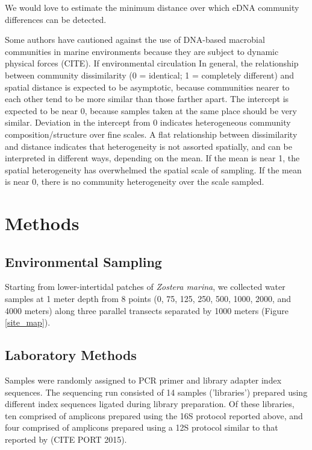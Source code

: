 \documentclass[11pt,letterpaper]{article} %
\begin{document}
We would love to estimate the minimum distance over which eDNA community differences can be detected.

Some authors have cautioned against the use of DNA-based macrobial communities in marine environments because they are subject to dynamic physical forces (CITE).
If environmental circulation 
In general, the relationship between community dissimilarity (0 = identical; 1 = completely different) and spatial distance is expected to be asymptotic, because communities nearer to each other tend to be more similar than those farther apart.
The intercept is expected to be near 0, because samples taken at the same place should be very similar. %
Deviation in the intercept from 0 indicates heterogeneous community composition/structure over fine scales.
A flat relationship between dissimilarity and distance indicates that heterogeneity is not assorted spatially, and can be interpreted in different ways, depending on the mean.
If the mean is near 1, the spatial heterogeneity has overwhelmed the spatial scale of sampling.
If the mean is near 0, there is no community heterogeneity over the scale sampled.


\section*{Methods}
\subsection*{Environmental Sampling}
Starting from lower-intertidal patches of \textit{Zostera marina}, we collected water samples at 1 meter depth from 8 points (0, 75, 125, 250, 500, 1000, 2000, and 4000 meters) along three parallel transects separated by 1000 meters (Figure \ref{site_map}).

\subsection*{Laboratory Methods}

Samples were randomly assigned to PCR primer and library adapter index sequences.
The sequencing run consisted of 14 samples ('libraries') prepared using different index sequences ligated during library preparation.
Of these libraries, ten comprised of amplicons prepared using the 16S protocol reported above, and four comprised of amplicons prepared using a 12S protocol similar to that reported by (CITE PORT 2015).
\end{document}
